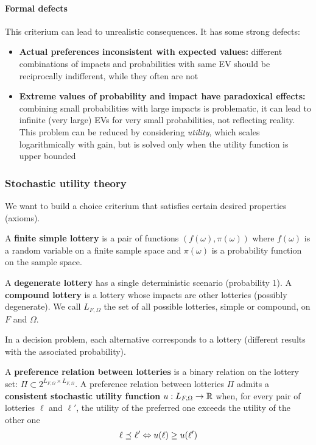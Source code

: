 \paragraph{Formal defects} This criterium can lead to unrealistic consequences. It has some strong defects: 
\begin{itemize}
	\item \textbf{Actual preferences inconsistent with expected values:} different combinations of impacts and probabilities with same EV should be reciprocally indifferent, while they often are not
	
	\item \textbf{Extreme values of probability and impact have paradoxical effects:} combining small probabilities with large impacts is problematic, it can lead to infinite (very large) EVs for very small probabilities, not reflecting reality. This problem can be reduced by considering \textit{utility}, which scales logarithmically with gain, but is solved only when the utility function is upper bounded
\end{itemize}

\subsubsection{Stochastic utility theory}

We want to build a choice criterium that satisfies certain desired properties (axioms). 

A \textbf{finite simple lottery} is a pair of functions $(f(\omega), \pi(\omega))$ where $f(\omega)$ is a random variable on a finite sample space and $\pi(\omega)$ is a probability function on the sample space.

A \textbf{degenerate lottery} has a single deterministic scenario (probability 1). A \textbf{compound lottery} is a lottery whose impacts are other lotteries (possibly degenerate). We call $L_{F, \Omega}$ the set of all possible lotteries, simple or compound, on $F$ and $\Omega$.

In a decision problem, each alternative corresponds to a lottery (different results with the associated probability).

A \textbf{preference relation between lotteries} is a binary relation on the lottery set: $\Pi \subset 2^{L_{F, \Omega} \times L_{F, \Omega}}$. A preference relation between lotteries $\Pi$ admits a \textbf{consistent stochastic utility function} $u : L_{F, \Omega} \rightarrow \operatorname{\mathbb{R}}$ when, for every pair of lotteries $\ell$ and $\ell'$, the utility of the preferred one exceeds the utility of the other one
$$ \ell \preceq_{} \ell' \Leftrightarrow u(\ell) \geq u (\ell') $$

